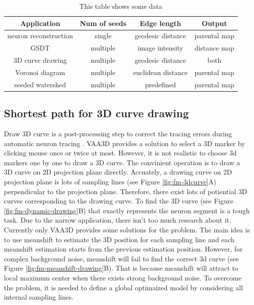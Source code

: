 \begin{table}
\begin{center}
\begin{tabular}{ | c | c | c | c |}
    \hline
    \textbf{Application} & \textbf{Num of seeds} & \textbf{Edge length} & \textbf{Output} \\ \hline
    neuron reconstruction & single & geodesic distance & parental map \\ \hline
    GSDT & multiple & image intensity & distance map  \\ \hline
    3D curve drawing & multiple & geodesic distance & both \\ \hline
    Voronoi diagram & multiple & euclidean distance & parental map  \\ \hline
    seeded watershed & multiple & predefined & parental map \\ \hline
  \end{tabular}
\end{center}
\caption{This table shows some data}
\label{tab:fm-app}
\end{table}

\subsection{Shortest path for 3D curve drawing}
\label{sect:fm-3dcurve}
Draw 3D curve is a post-processing step to correct the tracing errors during automatic neuron tracing \cite{peng2011automatic, Xiao:2012}. VAA3D \cite{peng2010v3d} provides a solution to select a 3D marker by clicking mouse once or twice at most. However, it is not realistic to choose 3d markers one by one to draw a 3D curve. The convinient operation is to draw a 3D curve on 2D projection plane directly. Accuately, a drawing curve on 2D projection plane is lots of sampling lines (see Figure \ref{fig:fm-3dcurve}A) perpendicular to the projection plane. Therefore, there exist lots of potiential 3D curves corresponding to the drawing curve. To find the 3D curve (see Figure \ref{fig:fm-dynamic-drawing}B) that exactly represents the neuron segment is a tough task. Due to the narrow application, there isn't too much research about it.\\
Currently only VAA3D provides some solutions for the problem. The main idea is to use meanshift \cite{comaniciu2002mean} to estimate the 3D position for each sampling line and each meanshift estimation starts from the previous estimation position. However, for complex background noise, meanshift will fail to find the correct 3d curve (see Figure \ref{fig:fm-meanshift-drawing}B). That is because meanshift will attract to local maximum center when there exists strong background noise. To overcome the problem, it is needed to define a global optimaized model by considering all internal sampling lines. \\
